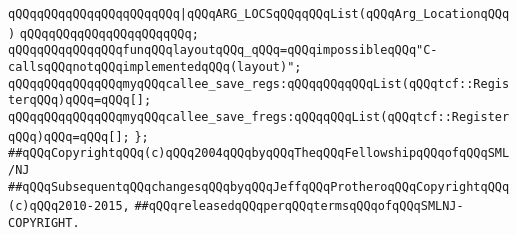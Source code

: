 \verb|qQQqqQQqqQQqqQQqqQQqqQQq|\verb#|qQQqARG_LOCSqQQqqQQqList(qQQqArg_LocationqQQq)#\newline
\verb|qQQqqQQqqQQqqQQqqQQqqQQq;|\newline
\newline
\verb|qQQqqQQqqQQqqQQqfunqQQqlayoutqQQq_qQQq=qQQqimpossibleqQQq"C-callsqQQqnotqQQqimplementedqQQq(layout)";|\newline
\newline
\verb|qQQqqQQqqQQqqQQqmyqQQqcallee_save_regs:qQQqqQQqqQQqList(qQQqtcf::RegisterqQQq)qQQq=qQQq[];|\newline
\verb|qQQqqQQqqQQqqQQqmyqQQqcallee_save_fregs:qQQqqQQqList(qQQqtcf::RegisterqQQq)qQQq=qQQq[];|\newline
\verb|};|\newline
\newline
\newline
\verb|##qQQqCopyrightqQQq(c)qQQq2004qQQqbyqQQqTheqQQqFellowshipqQQqofqQQqSML/NJ|\newline
\verb|##qQQqSubsequentqQQqchangesqQQqbyqQQqJeffqQQqProtheroqQQqCopyrightqQQq(c)qQQq2010-2015,|\newline
\verb|##qQQqreleasedqQQqperqQQqtermsqQQqofqQQqSMLNJ-COPYRIGHT.|\newline

